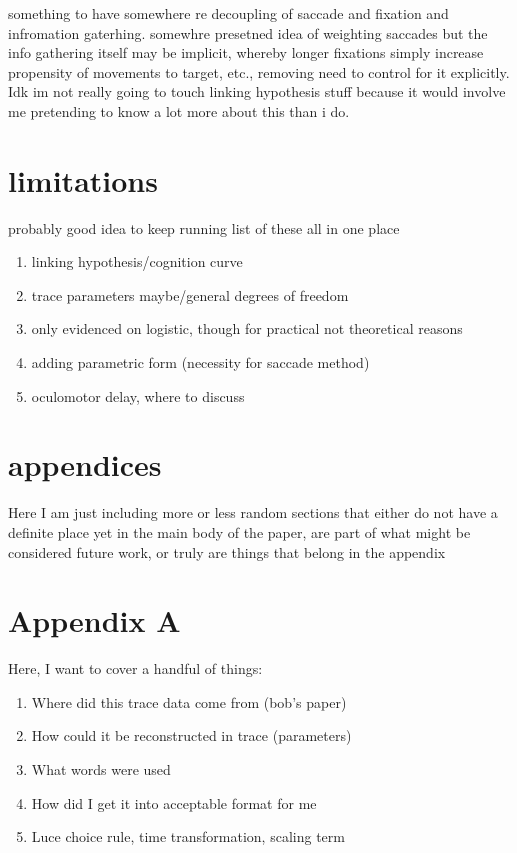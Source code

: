 \documentclass{article}
\begin{document}
something to have somewhere re decoupling of saccade and fixation and infromation gaterhing. somewhre presetned idea of weighting saccades but the info gathering itself may be implicit, whereby longer fixations simply increase propensity of movements to target, etc., removing need to control for it explicitly. Idk im not really going to touch linking hypothesis stuff because it would involve me pretending to know a lot more about this than i do.


\section{limitations}

probably good idea to keep running list of these all in one place

\begin{enumerate}
\item linking hypothesis/cognition curve
\item trace parameters maybe/general degrees of freedom
\item only evidenced on logistic, though for practical not theoretical reasons
\item adding parametric form (necessity for saccade method)
\item oculomotor delay, where to discuss
\end{enumerate}


\section{appendices}

Here  I am just including more or less random sections that either do not have a definite place yet in the main body of the paper, are part of what might be considered future work, or truly are things that belong in the appendix

\section*{Appendix A}



Here, I want to cover a handful of things:

\begin{enumerate}
\item Where did this trace data come from (bob's paper)
\item How could it be reconstructed in trace (parameters)
\item What words were used
\item How did I get it into acceptable format for me
\item Luce choice rule, time transformation, scaling term
\end{enumerate}
\end{document}
